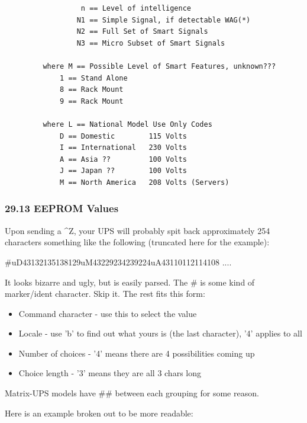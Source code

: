 {{{{{{{{{{{{{{{{{\begin{verbatim}
                  n == Level of intelligence
                 N1 == Simple Signal, if detectable WAG(*)
                 N2 == Full Set of Smart Signals
                 N3 == Micro Subset of Smart Signals
     
         where M == Possible Level of Smart Features, unknown???
             1 == Stand Alone
             8 == Rack Mount
             9 == Rack Mount
     
         where L == National Model Use Only Codes
             D == Domestic        115 Volts
             I == International   230 Volts
             A == Asia ??         100 Volts
             J == Japan ??        100 Volts
             M == North America   208 Volts (Servers)
\end{verbatim}
\normalsize

\label{EEPROM-Values}

\subsubsection*{29.13 EEPROM Values}

Upon sending a \^{}Z, your UPS will probably spit back approximately 254
characters something like the following (truncated here for the example):  

\#uD43132135138129uM43229234239224uA43110112114108 ....  

It looks bizarre and ugly, but is easily parsed. The \# is some kind of
marker/ident character. Skip it. The rest fits this form:  

\begin{itemize}
\item Command character - use this to select the value  
\item Locale - use 'b' to find out what yours is (the last character), '4'
applies to all  
\item Number of choices - '4' means there are 4 possibilities coming up  
\item Choice length - '3' means they are all 3 chars long 
\end{itemize}

Matrix-UPS models have \#\# between each grouping for some reason.  

Here is an example broken out to be more readable: 

\footnotesize
\begin{verbatim}
     

\end{verbatim}}}}}}}}}}}}}}}}}}
